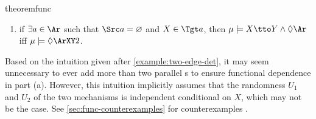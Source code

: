 \begin{linked}{theorem}{func}
\begin{enumerate}[label={(\alph*)}, itemsep=0pt,topsep=0pt,parsep=0.4ex]
\item 
if $\exists a \in \Ar$ such that $\Src a = \varnothing$ and $X \in \Tgt a$, 
then $\mu \models X {\tto} Y \land \Diamond \Ar$
iff
 $\mu \models \Diamond \ArXY 2$.
    \end{enumerate}
\end{linked}
Based on the intuition given after \cref{example:two-edge-det}, it may seem unnecessary to ever add more than two parallel \hyperarc s to ensure functional dependence in part (a). 
However, this intuition implicitly assumes that the randomness $U_1$ and $U_2$ of the two mechanisms is independent conditional on $X$,
which may not be the case.
See \cref{sec:func-counterexamples} for counterexamples
\unskip.


